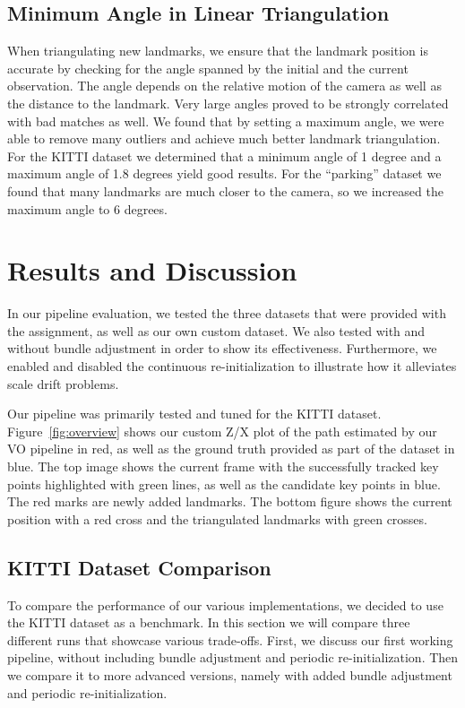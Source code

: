\documentclass[11pt]{article}
\begin{document}
\subsection{Minimum Angle in Linear Triangulation}
When triangulating new landmarks, we ensure that the landmark position is accurate by checking for the angle spanned by the initial and the current observation. The angle depends on the relative motion of the camera as well as the distance to the landmark.
Very large angles proved to be strongly correlated with bad matches as well. We found that by setting a maximum angle, we were able to remove many outliers and achieve much better landmark triangulation. 
For the KITTI dataset we determined that a minimum angle of 1 degree and a maximum angle of 1.8 degrees yield good results. For the “parking” dataset we found that many landmarks are much closer to the camera, so we increased the maximum angle to 6 degrees.

\section{Results and Discussion}
In our pipeline evaluation, we tested the three datasets that were provided with the assignment, as well as our own custom dataset. We also tested with and without bundle adjustment in order to show its effectiveness. Furthermore, we enabled and disabled the continuous re-initialization to illustrate how it alleviates scale drift problems.

Our pipeline was primarily tested and tuned for the KITTI dataset. Figure~\ref{fig:overview} shows our custom Z/X plot of the path estimated by our VO pipeline in red, as well as the ground truth provided as part of the dataset in blue. The top image shows the current frame with the successfully tracked key points highlighted with green lines, as well as the candidate key points in blue. The red marks are newly added landmarks. The bottom figure shows the current position with a red cross and the triangulated landmarks with green crosses.

\subsection{KITTI Dataset Comparison}
To compare the performance of our various implementations, we decided to use the KITTI dataset as a benchmark. In this section we will compare three different runs that showcase various trade-offs. First, we discuss our first working pipeline, without including bundle adjustment and periodic re-initialization. Then we compare it to more advanced versions, namely with added bundle adjustment and periodic re-initialization.
\end{document}
